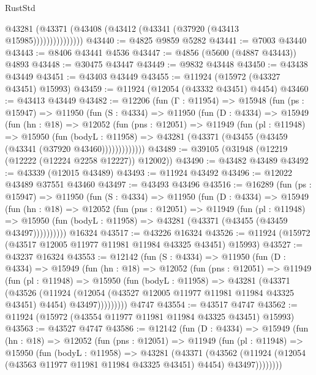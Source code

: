 \begin{lexlean}{RustStd}
\begin{coremodule}
                    @43281 (@43371 (@43408 (@43412 (@43341 (@37920 (@43413 @15985)))))))))))))))
@43440 := @4825 @9859 @5282
@43441 := @7003 @43440
@43443 := @8406 @43441 @4536
@43447 := @4856 (@5600 (@4887 @43443)) @4893
@43448 := @30475 @43447
@43449 := @9832 @43448
@43450 := @43438 @43449
@43451 := @43403 @43449
@43455 := @11924 (@15972 (@43327 @43451) @15993)
@43459 := @11924 (@12054 (@43332 @43451) @4454)
@43460 := @43413 @43449
@43482 := @12206
    (fun (Γ : @11954) =>
    @15948
      (fun (ps : @15947) =>
      @11950
        (fun (S : @4334) =>
        @11950
          (fun (D : @4334) =>
          @15949
            (fun (hn : @18) =>
            @12052
              (fun (pns : @12051) =>
              @11949
                (fun (pl : @11948) =>
                @15950
                  (fun (bodyL : @11958) =>
                  @43281 (@43371 (@43455 (@43459 (@43341 (@37920 @43460)))))))))))))
@43489 := @39105 (@31948 (@12219 (@12222 (@12224 @2258 @12227)) @12002))
@43490 := @43482 @43489
@43492 := @43339 (@12015 @43489)
@43493 := @11924 @43492
@43496 := @12022 @43489 @37551 @43460
@43497 := @43493 @43496
@43516 := @16289
    (fun (ps : @15947) =>
    @11950
      (fun (S : @4334) =>
      @11950
        (fun (D : @4334) =>
        @15949
          (fun (hn : @18) =>
          @12052
            (fun (pns : @12051) =>
            @11949
              (fun (pl : @11948) =>
              @15950 (fun (bodyL : @11958) => @43281 (@43371 (@43455 (@43459 @43497))))))))))
    @16324
@43517 := @43226 @16324
@43526 := @11924 (@15972 (@43517 @12005 @11977 @11981 @11984 @43325 @43451) @15993)
@43527 := @43237 @16324
@43553 := @12142
    (fun (S : @4334) =>
    @11950
      (fun (D : @4334) =>
      @15949
        (fun (hn : @18) =>
        @12052
          (fun (pns : @12051) =>
          @11949
            (fun (pl : @11948) =>
            @15950
              (fun (bodyL : @11958) =>
              @43281
                (@43371
                  (@43526
                    (@11924
                      (@12054 (@43527 @12005 @11977 @11981 @11984 @43325 @43451) @4454)
                      @43497)))))))))
    @4747
@43554 := @43517 @4747
@43562 := @11924 (@15972 (@43554 @11977 @11981 @11984 @43325 @43451) @15993)
@43563 := @43527 @4747
@43586 := @12142
    (fun (D : @4334) =>
    @15949
      (fun (hn : @18) =>
      @12052
        (fun (pns : @12051) =>
        @11949
          (fun (pl : @11948) =>
          @15950
            (fun (bodyL : @11958) =>
            @43281
              (@43371
                (@43562
                  (@11924 (@12054 (@43563 @11977 @11981 @11984 @43325 @43451) @4454) @43497))))))))

\end{coremodule}
\end{lexlean}
